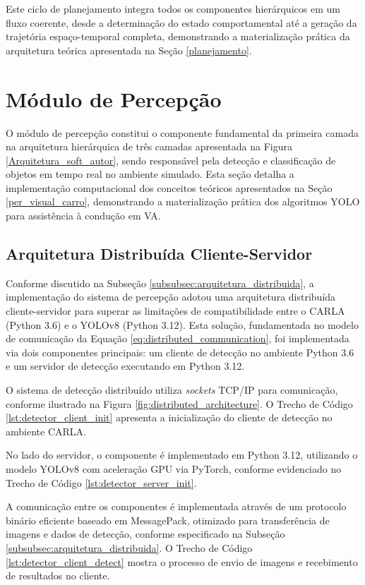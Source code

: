 Este ciclo de planejamento integra todos os componentes hierárquicos em um fluxo coerente, desde a determinação do estado comportamental até a geração da trajetória espaço-temporal completa, demonstrando a materialização prática da arquitetura teórica apresentada na Seção \ref{planejamento}.

\section{Módulo de Percepção} \label{implementacao_yolo}

O módulo de percepção constitui o componente fundamental da primeira camada na arquitetura hierárquica de três camadas apresentada na Figura \ref{Arquitetura_soft_autor}, sendo responsável pela detecção e classificação de objetos em tempo real no ambiente simulado. Esta seção detalha a implementação computacional dos conceitos teóricos apresentados na Seção \ref{per_visual_carro}, demonstrando a materialização prática dos algoritmos YOLO para assistência à condução em VA.

\subsection{Arquitetura Distribuída Cliente-Servidor} \label{subsec:implementacao_arquitetura_distribuida}

Conforme discutido na Subseção \ref{subsubsec:arquitetura_distribuida}, a implementação do sistema de percepção adotou uma arquitetura distribuída cliente-servidor para superar as limitações de compatibilidade entre o CARLA (Python 3.6) e o YOLOv8 (Python 3.12). Esta solução, fundamentada no modelo de comunicação da Equação \ref{eq:distributed_communication}, foi implementada via dois componentes principais: um cliente de detecção no ambiente Python 3.6 e um servidor de detecção executando em Python 3.12.

O sistema de detecção distribuído utiliza \textit{sockets} TCP/IP para comunicação, conforme ilustrado na Figura \ref{fig:distributed_architecture}. O Trecho de Código \ref{lst:detector_client_init} apresenta a inicialização do cliente de detecção no ambiente CARLA.

No lado do servidor, o componente é implementado em Python 3.12, utilizando o modelo YOLOv8 com aceleração GPU via PyTorch, conforme evidenciado no Trecho de Código \ref{lst:detector_server_init}.

A comunicação entre os componentes é implementada através de um protocolo binário eficiente baseado em MessagePack, otimizado para transferência de imagens e dados de detecção, conforme especificado na Subseção \ref{subsubsec:arquitetura_distribuida}. O Trecho de Código \ref{lst:detector_client_detect} mostra o processo de envio de imagens e recebimento de resultados no cliente.

